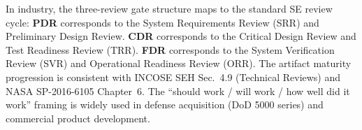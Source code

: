 
\begin{keyconceptbox}
In industry, the three-review gate structure maps to the standard SE review cycle: \textbf{PDR} corresponds to the System Requirements Review (SRR) and Preliminary Design Review. \textbf{CDR} corresponds to the Critical Design Review and Test Readiness Review (TRR). \textbf{FDR} corresponds to the System Verification Review (SVR) and Operational Readiness Review (ORR). The artifact maturity progression is consistent with INCOSE SEH Sec.~4.9 (Technical Reviews) and NASA SP-2016-6105 Chapter~6. The ``should work / will work / how well did it work'' framing is widely used in defense acquisition (DoD 5000 series) and commercial product development.
\end{keyconceptbox}
